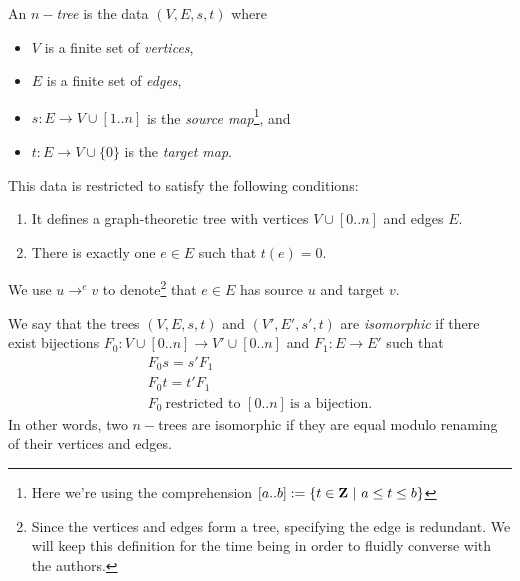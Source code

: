 %
%

\begin{defn}\label{def-tree}
	An $n-$\emph{tree} is the data $(V, E, s, t)$ where
	\begin{itemize}
		\item $V$ is a finite set of \emph{vertices},
		\item $E$ is a finite set of \emph{edges},
		\item $s : E \to V \cup [1..n]$ is the
			\emph{source map}\footnote{Here we're using the
			comprehension $[a..b] :=
			\{t \in \mathbf{Z} \ | \ a \leq t \leq b\}$}, and
		\item $t : E \to V \cup \{0\}$ is the \emph{target map}.
	\end{itemize}
	This data is restricted to satisfy the following conditions:
	\begin{enumerate}
		\item It defines a graph-theoretic tree with vertices
			$V \cup [0..n]$ and edges $E$.
		\item There is exactly one $e \in E$ such that $t(e) = 0$.
	\end{enumerate}
	We use $u \to^{e} v$ to denote\footnote{Since the vertices and
	edges form a tree,  specifying the edge is redundant. We will keep
	this definition for the time being in order to fluidly converse
	with the authors.} that $e \in E$ has source $u$ and target $v$.
\end{defn}

\begin{defn}\label{tree-iso}
	We say that the trees $(V,E,s,t)$ and $(V',E',s',t)$ are
	\emph{isomorphic} if there exist bijections $F_0 : V \cup [0..n]
	\to V' \cup [0..n]$ and $F_1 : E \to E'$ such that
	\begin{eqnarray}
		F_0s= s'F_1\\
		F_0t= t'F_1\\
		F_0\ \text{restricted to } [0..n]\ \text{is a bijection.}
	\end{eqnarray}
	In other words, two $n-$trees are isomorphic if they are equal
	modulo renaming of their vertices and edges.
\end{defn}

